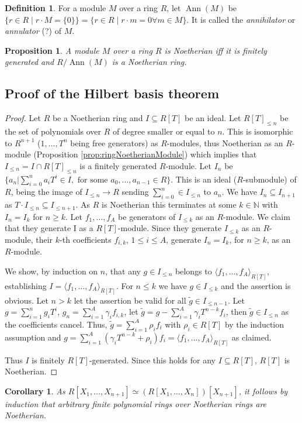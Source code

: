 \documentclass[DIV=14,parskip=half]{scrartcl}
\newtheorem{cor}{Corollary}[subsection]
\newtheorem{prop}{Proposition}[subsection]
\theoremstyle{definition}
\newtheorem{defi}{Definition}[subsection]
\newcommand{\N}{\mathbb{N}}
\newcommand{\longto}{\longrightarrow}
\newcommand{\Ann}{\operatorname{Ann}}
\begin{document}
\begin{defi}\label{def:annihilator}
 For a module $M$ over a ring $R$, let $\Ann(M)$ be $\{r\in R\mid r\cdot M = \{0\}\} = \{r\in R\mid r\cdot m = 0 \forall m\in M\}$. It is called the \emph{annihilator} or \emph{annulator} (?) of $M$.
\end{defi}
\begin{prop}
 A module $M$ over a ring $R$ is Noetherian iff it is finitely generated and $R/\Ann(M)$ is a Noetherian ring.
\end{prop}

\subsection{Proof of the Hilbert basis theorem}\label{sec:HilbertBasisProof}
\begin{proof}\label{proof:HilbertBasis}
Let $R$ be a Noetherian ring and $I\subseteq R[T]$ be an ideal. Let $R[T]_{\leq n}$ be the set of polynomials over $R$ of degree smaller or equal to $n$. This is isomorphic to $R^{n+1}$ ($1,\ldots, T^n$ being free generators) as $R$-modules, thus Noetherian as an $R$-module (Proposition \ref{prop:ringNoetherianModule}) which implies that $I_{\leq n} = I \cap R[T]_{\leq n}$ is a finitely generated $R$-module. Let $I_n$ be $\{a_n|\sum_{i=0}^na_iT^i \in I, \text{ for some } a_0,\ldots,a_{n-1}\in R\}$. This is an ideal ($R$-submodule) of $R$, being the image of $I_{\leq n} \longto R$ sending $\sum_{i=0}^n\in I_{\leq n}$ to $a_n$. We have $I_n\subseteq I_{n+1}$ as $T\cdot I_{\leq n}\subseteq I_{\leq n+1}$. As $R$ is Noetherian this terminates at some $k\in\N$ with $I_n = I_k$ for $n\geq k$. Let $f_1,\ldots, f_A$ be generators of $I_{\leq k}$ as an $R$-module. We claim that they generate I as a $R[T]$-module. Since they generate $I_{\leq k}$ as an $R$-module, their $k$-th coefficients $f_{i,k}$, $1\leq i\leq A$, generate $I_n = I_k$, for $n\geq k$, as an $R$-module.

We show, by induction on $n$, that any $g\in I_{\leq n}$ belongs to $\langle f_1,\ldots,f_A\rangle_{R[T]}$, establishing $I= \langle f_1,\ldots, f_A\rangle_{R[T]}$. For $n\leq k$ we have $g\in I_{\leq k}$ and the assertion is obvious. Let $n>k$ let the assertion be valid for all $\tilde g \in I_{\leq n-1}$. Let $g=\sum_{i=1}^n g_iT^i$, $g_n = \sum_{i=1}^A \gamma_i f_{i,k}$, let $\tilde g = g-\sum_{i=1}^A \gamma_i T^{n-k} f_i$, then $\tilde g\in I_{\leq n}$ as the coefficients cancel. Thus, $\tilde g = \sum_{i=1}^A\rho_i f_i$ with $\rho_i\in R[T]$ by the induction assumption and $g=\sum_{i=1}^A(\gamma_i T^{n-k} +\rho_i) f_i = \langle f_1,\ldots,f_A\rangle_{R[T]}$ as claimed.

Thus $I$ is finitely $R[T]$-generated. Since this holds for any $I\subseteq R[T]$, $R[T]$ is Noetherian.
\end{proof}
\begin{cor}\label{cor:NoetherianPolynomial}
 As $R[X_1,\ldots,X_{n+1}] \simeq (R[X_1,\ldots,X_n])[X_{n+1}]$, it follows by induction that arbitrary finite polynomial rings over Noetherian rings are Noetherian.
\end{cor}
\end{document}
